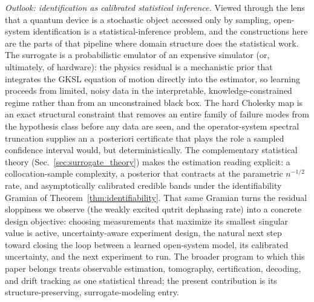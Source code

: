 \documentclass[twocolumn,aps,prxquantum,superscriptaddress,nofootinbib,floatfix,longbibliography]{revtex4-2}
\begin{document}
\emph{Outlook: identification as calibrated statistical inference.} Viewed through the lens that a quantum device is a stochastic object accessed only by sampling, open-system identification is a statistical-inference problem, and the constructions here are the parts of that pipeline where domain structure does the statistical work. The surrogate is a probabilistic emulator of an expensive simulator (or, ultimately, of hardware): the physics residual is a mechanistic prior that integrates the GKSL equation of motion directly into the estimator, so learning proceeds from limited, noisy data in the interpretable, knowledge-constrained regime rather than from an unconstrained black box. The hard Cholesky map is an exact structural constraint that removes an entire family of failure modes from the hypothesis class before any data are seen, and the operator-system spectral truncation supplies an a~posteriori certificate that plays the role a sampled confidence interval would, but deterministically. The complementary statistical theory (Sec.~\ref{sec:surrogate_theory}) makes the estimation reading explicit: a collocation-sample complexity, a posterior that contracts at the parametric $n^{-1/2}$ rate, and asymptotically calibrated credible bands under the identifiability Gramian of Theorem~\ref{thm:identifiability}. That same Gramian turns the residual sloppiness we observe (the weakly excited qutrit dephasing rate) into a concrete design objective: choosing measurements that maximize its smallest singular value is active, uncertainty-aware experiment design, the natural next step toward closing the loop between a learned open-system model, its calibrated uncertainty, and the next experiment to run. The broader program to which this paper belongs treats observable estimation, tomography, certification, decoding, and drift tracking as one statistical thread; the present contribution is its structure-preserving, surrogate-modeling entry.
\end{document}
